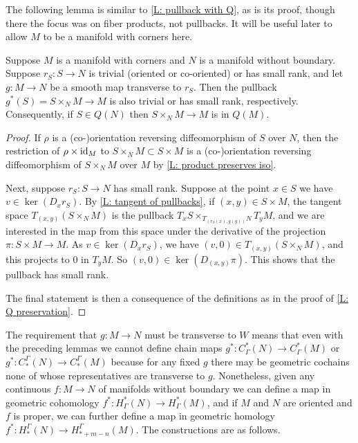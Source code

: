 The following lemma is similar to \cref{L: pullback with Q}, as is its proof, though there the focus was on fiber products, not pullbacks.
It will be useful later to allow $M$ to be a manifold with corners here.

\begin{comment}
	\red{GBF: Might want to try to combine those into a single lemma somewhere at some point, but it looks like it might be less messy, if a bit redundant, not to.}
\end{comment}

\begin{lemma}\label{L: pullback map Q}
	Suppose $M$ is a manifold with corners and $N$ is a manifold without boundary.
	Suppose $r_S \colon S \to N$ is trivial (oriented or co-oriented) or has small rank, and let $g \colon M \to N$ be a smooth map transverse to $r_S$.
	Then the pullback $g^*(S) = S \times_N M \to M$ is also trivial or has small rank, respectively.
	Consequently, if $S \in Q(N)$ then $S \times_N M \to M$ is in $Q(M)$.
\end{lemma}

\begin{proof}
	If $\rho$ is a (co\nobreakdash-)orientation reversing diffeomorphism of $S$ over $N$, then the restriction of $\rho \times \mathrm{id}_M$ to $S \times_N M \subset S \times M$ is a (co\nobreakdash-)orientation reversing diffeomorphism of $S \times_N M$ over $M$ by \cref{L: product preserves iso}.

	Next, suppose $r_S \colon S \to N$ has small rank.
	Suppose at the point $x \in S$ we have $v \in \ker(D_x r_S)$.
	By \cref{L: tangent of pullbacks}, if $(x,y) \in S \times M$, the tangent space $T_{(x,y)}(S \times_N M)$ is the pullback $T_xS\times_{T_{(r_S(x),g(y))}N} T_y M$, and we are interested in the map from this space under the derivative of the projection $\pi \colon S \times M \to M$.
	As $v \in \ker (D_xr_S)$, we have $(v,0) \in T_{(x,y)}(S \times_N M)$, and this projects to $0$ in $T_yM$.
	So $(v,0) \in \ker(D_{(x,y)}\pi)$.
	This shows that the pullback has small rank.

	The final statement is then a consequence of the definitions as in the proof of \cref{L: Q preservation}.
\end{proof}

The requirement that $g \colon M \to N$ must be transverse to $W$ means that even with the preceding lemmas we cannot define chain maps $g^* \colon C^*_\Gamma(N) \to C^*_\Gamma(M)$ or $g^* \colon C_*^\Gamma(N) \to C_*^\Gamma(M)$ because for any fixed $g$ there may be geometric cochains none of whose representatives are transverse to $g$.
Nonetheless, given any continuous $f \colon M \to N$ of manifolds without boundary we can define a map in geometric cohomology $f^* \colon H^*_\Gamma(N) \to H^*_\Gamma(M)$, and if $M$ and $N$ are oriented and $f$ is proper, we can further define a map in geometric homology $f^* \colon H_*^\Gamma(N) \to H_{*+m-n}^\Gamma(M)$.
The constructions are as follows.

